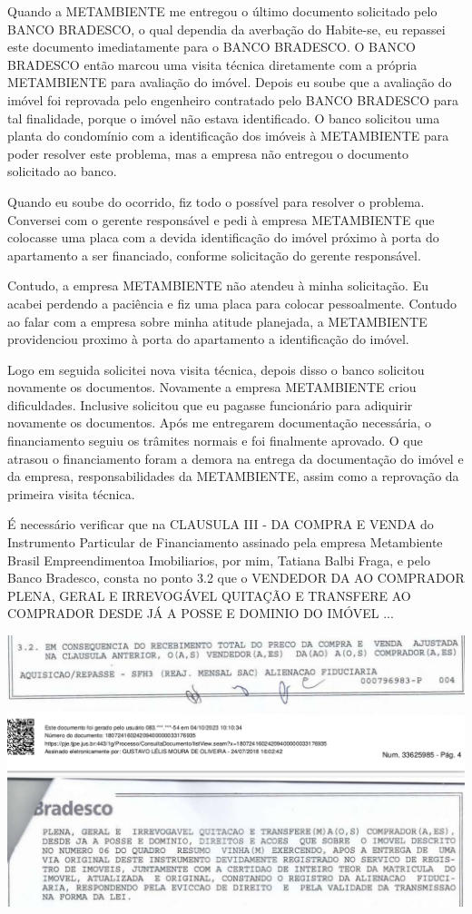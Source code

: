 \documentclass[11pt]{letter}
\begin{document}
Quando a METAMBIENTE me entregou o último documento solicitado pelo BANCO BRADESCO, o qual dependia da averbação do Habite-se, eu repassei este documento imediatamente para o BANCO BRADESCO. O BANCO BRADESCO então marcou uma visita técnica diretamente com a própria METAMBIENTE para avaliação do imóvel. Depois eu soube que a avaliação do imóvel foi reprovada pelo engenheiro contratado pelo BANCO BRADESCO para tal finalidade, porque o imóvel não estava identificado. O banco solicitou uma planta do condomínio com a identificação dos imóveis à METAMBIENTE para poder resolver este problema, mas a empresa não entregou o documento solicitado ao banco. 

Quando eu soube do ocorrido, fiz todo o possível para resolver o problema. Conversei com o gerente responsável e pedi à empresa METAMBIENTE que colocasse uma placa com a devida identificação do imóvel próximo à porta do apartamento a ser financiado, conforme solicitação do gerente responsável. 

Contudo, a empresa METAMBIENTE não atendeu à minha solicitação. Eu acabei perdendo a paciência e fiz uma placa para colocar pessoalmente. Contudo ao falar com a empresa sobre minha atitude planejada, a METAMBIENTE providenciou proximo à porta do apartamento a identificação do imóvel. 

Logo em seguida solicitei nova visita técnica, depois disso o banco solicitou novamente os documentos. Novamente a empresa METAMBIENTE criou dificuldades. Inclusive solicitou que eu pagasse funcionário para adiquirir novamente os documentos. Após me entregarem documentação necessária, o financiamento seguiu os trâmites normais e foi finalmente aprovado. O que atrasou o financiamento foram a demora na entrega da documentação do imóvel e da empresa, responsabilidades da METAMBIENTE, assim como a reprovação da primeira visita técnica. 

É necessário verificar que na CLAUSULA III - DA COMPRA E VENDA do Instrumento Particular de Financiamento assinado pela empresa Metambiente Brasil Empreendimentoa Imobiliarios, por mim, Tatiana Balbi Fraga, e pelo Banco Bradesco,  consta no ponto 3.2 que o VENDEDOR DA AO COMPRADOR PLENA, GERAL E IRREVOGÁVEL QUITAÇÃO E TRANSFERE AO COMPRADOR DESDE JÁ A POSSE E DOMINIO DO IMÓVEL ... 

\includegraphics[width=\textwidth]{doc2.png}
\end{document}
